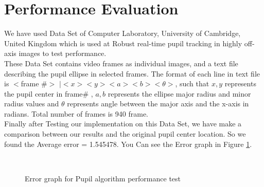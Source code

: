 \section{Performance Evaluation} 
	We have used Data Set of Computer Laboratory, University of Cambridge, United Kingdom which is used at Robust real-time pupil tracking in highly off-axis images to test performance. \cite{swirski} \\
	These Data Set contains video frames as individual images, and a text file describing the pupil ellipse in selected frames. The format of each line in text file is $<$frame \#$>$ $| <x> <y> <a> <b> < \theta >$, such that $ x , y$ represents the pupil center in frame\# , $ a, b$ represents the ellipse major radius and minor radius  values and $\theta$ represents angle between the major axis and the x-axis in radians. Total number of frames is 940 frame. \\
	Finally after Testing our implementation on this Data Set, we have make a comparison between our results and the original pupil center location. So we found the Average error = 1.545478. You Can see the 	Error graph in Figure \ref{fig:ErrorGraph}.
		

\begin{figure}[]
\begin{dBox}
\centering
  \mbox{
   }
   \caption{Error graph for Pupil algorithm performance test
   \label{fig:ErrorGraph} }   
\end{dBox}   
\end{figure}
